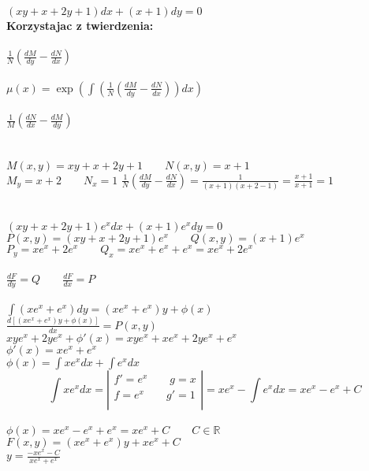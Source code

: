 \documentclass[10pt,a4paper]{article}
\begin{document}
	\begin{center}
		$(xy + x +2y +1) dx + (x + 1)dy = 0$ \\
		\textbf{Korzystajac z twierdzenia: } \\
		 \\
		$\frac{1}{N}(\frac{dM}{dy} - \frac{dN}{dx})$ \\ 
		 \\
		$\mu (x) = \exp(\int (\frac{1}{N}(\frac{dM}{dy} - \frac{dN}{dx})) dx )  $ \\
		 \\
		$\frac{1}{M}(\frac{dN}{dx} - \frac{dM}{dy})$ \\ 
		 \\
		
	    \\
	    $M(x,y) = xy + x +2y + 1 \qquad N(x,y) = x+1 $ \\
	    $M_{y} = x + 2 \qquad N_{x} = 1$
	    $\frac{1}{N}(\frac{dM}{dy} - \frac{dN}{dx}) = \frac{1}{(x+1)(x + 2 - 1)} = \frac{x+1}{x+1} = 1$\\
	     \\
	    \\
	    $(xy + x +2y +1)e^x dx + (x + 1)e^xdy = 0$ \\
	    $P(x,y) = (xy + x +2y +1)e^x \qquad Q(x,y) = (x+1)e^x$ \\
	    $P_{y} = xe^x + 2e^x  \qquad Q_{x} = xe^x + e^x+e^x = xe^x + 2e^x$ \\
	     \\
	    $\frac{dF}{dy} = Q \qquad \frac{dF}{dx} = P $ \\
	     \\
	    $\int (xe^x + e^x) dy = (xe^x + e^x)y + \phi (x) $ \\
	    $\frac{d[(xe^x + e^x)y + \phi (x)]}{dx} = P(x,y)$ \\
	    $xye^x + 2ye^x + \phi'(x) =  xye^x + xe^x +2ye^x + e^x$ \\
	    $\phi'(x) = xe^x + e^x $ \\
	    $\phi (x) = \int xe^x dx + \int e^x dx$ \\
	    $$\int xe^x dx = 
	    \left| \begin{array}{c}
	    f' = e^x \qquad g=x\\
	    f = e^x \qquad g'=1\\
	    \end{array} \right| = xe^x -\int e^x dx = xe^x - e^x + C
	    $$ \\
	    $\phi (x) = xe^x - e^x + e^x = xe^x + C \qquad C \in \mathbb{R}$ \\
	    $F(x,y) = (xe^x + e^x)y + xe^x + C $\\ 
	    $y= \frac{-xe^x - C}{xe^x + e^x}$
	    
	    
	\newpage 	
	\end{center}		
\end{document}
